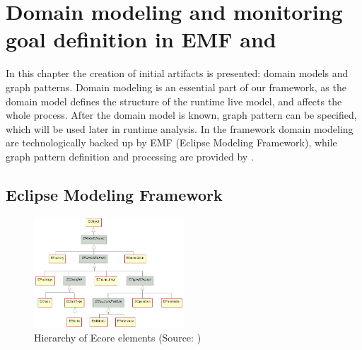 \chapter{Domain modeling and monitoring goal definition in EMF and \viatra{}}

In this chapter the creation of initial artifacts is presented: domain models and graph patterns.
Domain modeling is an essential part of our framework, as the domain model defines the structure of the runtime live model, and affects the whole process. 
After the domain model is known, graph pattern can be specified, which will be used later in runtime analysis.
In the framework domain modeling are technologically backed up by EMF (Eclipse Modeling Framework), 
while graph pattern definition and processing are provided by \viatra{}.

\section{Eclipse Modeling Framework}


\begin{figure}
	\begin{center}
		\includegraphics[width=0.5\textwidth]{figures/EcoreHierarchy.png}
		\caption{Hierarchy of Ecore elements (Source: \cite{ecore-package}) }
		\label{fig:ecore-hierarchy}
	\end{center}
\end{figure}

